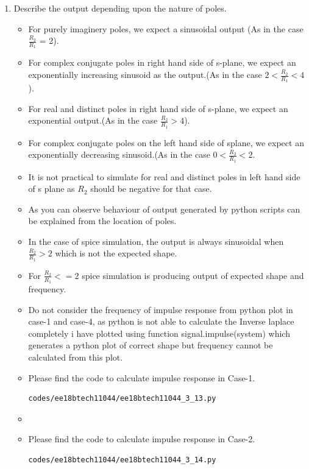 \begin{enumerate}[label=\arabic*.,ref=\theenumi]
\item Describe the output depending upon the nature of poles.

\solution 

\begin{itemize}
\item For purely imaginery poles, we expect a sinusoidal output (As in the case $\frac{R_2}{R_1}$ = 2).
\item For complex conjugate poles in right hand side of s-plane, we expect an exponentially increasing sinusoid as the output.(As in the case $2 < \frac{R_2}{R_1} < 4$).
\item For real and distinct poles in right hand side of s-plane, we expect an exponential  output.(As in the case $\frac{R_2}{R_1} > 4$).
\item For complex conjugate poles on the left hand side of splane, we expect an exponentially decreasing sinusoid.(As in the case $0 <  \frac{R_2}{R_1} < 2$.
\item It is not practical to simulate for real and distinct poles in left hand side of s plane as $R_2$ should be negative for that case. 
\item As you can observe behaviour of output generated by python scripts can be explained from the location of poles.
\item In the case of spice simulation, the output is always sinusoidal when $\frac{R_2}{R_1} > 2$ which is not the expected shape. 
\item For $\frac{R_2}{R_1} <= 2$ spice simulation is producing output of expected shape and frequency. 
\item Do not consider the frequency of impulse response from python plot in case-1 and case-4, as python is not able to calculate the Inverse laplace completely i have plotted using function signal.impulse(system) which generates a python plot of correct shape but frequency cannot be calculated from this plot.
\item Please find the code to calculate impulse response in Case-1.
\begin{lstlisting}
codes/ee18btech11044/ee18btech11044_3_13.py
\end{lstlisting}
\item \item Please find the code to calculate impulse response in Case-2.
\begin{lstlisting}
codes/ee18btech11044/ee18btech11044_3_14.py
\end{lstlisting}


\end{itemize}
\end{enumerate}
